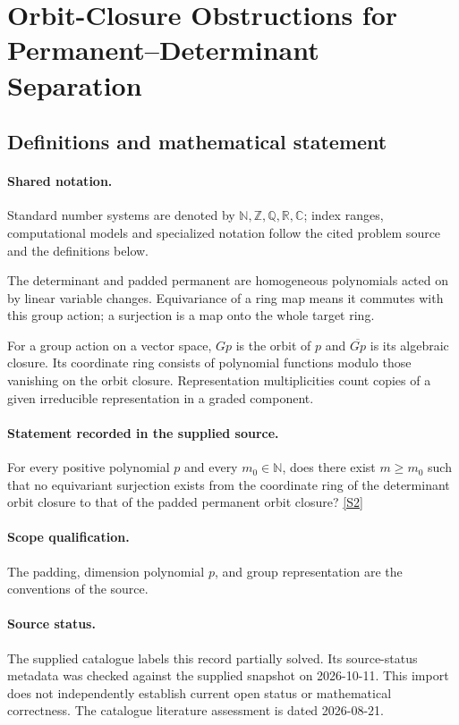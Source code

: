 \documentclass[11pt]{article}
\newcommand{\sref}[2]{\hyperlink{source:#1:#2}{[S#2]}}
\begin{document}
\section{Orbit-Closure Obstructions for Permanent–Determinant Separation}\label{statement}

\subsection{Definitions and mathematical statement}

\paragraph{Shared notation.}Standard number systems are denoted by $\mathbb N,\mathbb Z,\mathbb Q,\mathbb R,\mathbb C$; index ranges, computational models and specialized notation follow the cited problem source and the definitions below.


The determinant and padded permanent are homogeneous polynomials acted on by linear variable changes. Equivariance of a ring map means it commutes with this group action; a surjection is a map onto the whole target ring.

For a group action on a vector space, $Gp$ is the orbit of $p$ and $\overline{Gp}$ is its algebraic closure. Its coordinate ring consists of polynomial functions modulo those vanishing on the orbit closure. Representation multiplicities count copies of a given irreducible representation in a graded component.
\paragraph{Statement recorded in the supplied source.}
For every positive polynomial $p$ and every $m_0\in\mathbb{N}$, does there exist $m\geq m_0$ such that no equivariant surjection exists from the coordinate ring of the determinant orbit closure to that of the padded permanent orbit closure? \sref{statement}{2}
\paragraph{Scope qualification.}
The padding, dimension polynomial $p$, and group representation are the conventions of the source.
\paragraph{Source status.}
The supplied catalogue labels this record partially solved. Its source-status metadata was checked against the supplied snapshot on 2026-10-11. This import does not independently establish current open status or mathematical correctness. The catalogue literature assessment is dated 2026-08-21.
\end{document}

